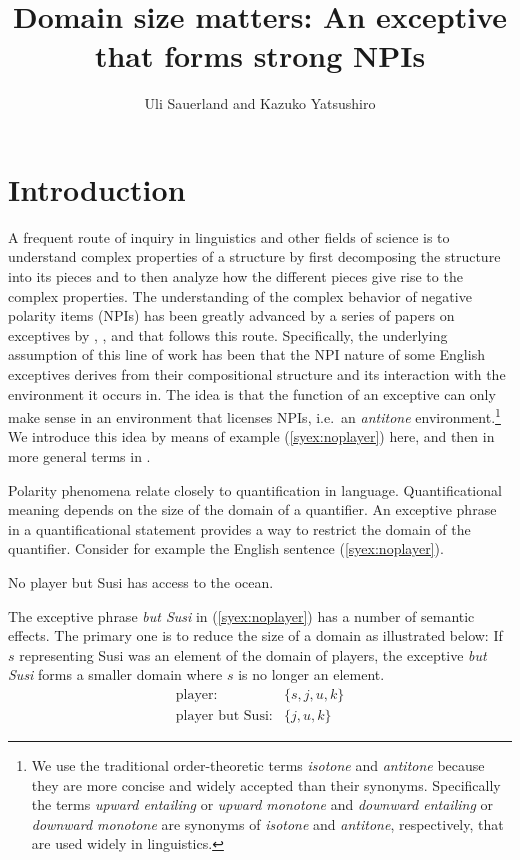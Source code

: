 \documentclass[output=paper]{langscibook}
\author{
    Uli Sauerland%
        \affiliation{Osaka University; Leibniz-Zentrum Allgemeine Sprachwissenschaft}
    and 
    Kazuko Yatsushiro%
        \affiliation{Leibniz-Zentrum Allgemeine Sprachwissenschaft}
}
\title{Domain size matters: An exceptive that forms strong NPIs}
\begin{document}

\maketitle


\section{Introduction}\largerpage[-1]

A frequent route of inquiry in linguistics and other fields of science is to understand complex properties of a structure by first decomposing the structure into its pieces and to then analyze how the different pieces give rise to the complex properties.
The understanding of the complex behavior of negative polarity items (NPIs) has been greatly advanced by a series of papers on exceptives by \citet{fintel93}, \citet{gajewski08b}, and \citet{hirsch16b} that follows this  route.
Specifically, the underlying assumption of this line of work has been that the NPI nature of some English exceptives derives from their compositional structure and its interaction with the environment it occurs in. %
%
The idea is that the function of an exceptive can only make sense in an environment that licenses NPIs, i.e.\ an \mbox{\emph{antitone}} environment.\footnote{We use the traditional order-theoretic terms \emph{isotone} and \emph{antitone} \citep{birkhoff40a} because they are more concise and widely accepted than their synonyms.
Specifically the terms \emph{upward entailing} or \emph{upward monotone} and \emph{downward entailing} or \emph{downward monotone}  are synonyms of \emph{isotone} and \emph{antitone}, respectively, that are used widely in linguistics.}
We introduce this idea by means of example (\ref{syex:noplayer}) here, and then in more general terms in .

Polarity phenomena relate closely to quantification in language.
Quantificational meaning depends on the size of the domain of a quantifier.
An exceptive phrase in a quantificational statement provides a way to restrict the domain of the quantifier.  Consider for example the English sentence (\ref{syex:noplayer}).

\ea \label{syex:noplayer} 
   No player but Susi has access to the ocean.\z

The exceptive phrase \emph{but Susi} in (\ref{syex:noplayer}) has a number of semantic effects. The primary one is to reduce the size of a domain as illustrated below:
If $s$ representing Susi was an element of the domain of players, the exceptive \emph{but Susi} forms a smaller domain where $s$ is no longer an element.
\begin{eqnarray*}
\text{player:} & \{s, j, u, k\} \\
\text{player but Susi:} & \{j, u, k\}
\end{eqnarray*}
\end{document}
